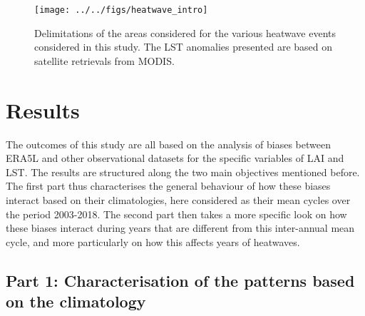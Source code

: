 \documentclass[gmd, manuscript]{copernicus}
\begin{document}
\begin{figure}[H]
\begin{center}
\texttt{[image: ../../figs/heatwave\_intro]}
\caption{{Delimitations of the areas considered for the various heatwave events
considered in this study. The LST anomalies presented are based on
satellite retrievals from MODIS.
{\label{946697}}%
}}
\end{center}
\end{figure}



\section{Results}


The outcomes of this study are all based on the analysis of biases
between ERA5L and other observational datasets for the specific
variables of LAI and LST. The results are structured along the two main
objectives mentioned before. The first part thus characterises the
general behaviour of how these biases interact based on their
climatologies, here considered as their mean cycles over the period
2003-2018. The second part then takes a more specific look on how these
biases interact during years that are different from this inter-annual
mean cycle, and more particularly on how this affects years of
heatwaves.

\par\null

\subsection*{Part 1: Characterisation of the patterns based on the
climatology}

{\label{835449}}
\end{document}

